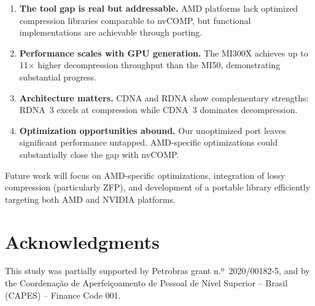 \documentclass[runningheads]{llncs}
\begin{document}
\begin{enumerate}
    \item \textbf{The tool gap is real but addressable.} AMD platforms lack optimized compression libraries comparable to nvCOMP, but functional implementations are achievable through porting.
    
    \item \textbf{Performance scales with GPU generation.} The MI300X achieves up to 11$\times$ higher decompression throughput than the MI50, demonstrating substantial progress.
    
    \item \textbf{Architecture matters.} CDNA and RDNA show complementary strengths: RDNA~3 excels at compression while CDNA~3 dominates decompression.
    
    \item \textbf{Optimization opportunities abound.} Our unoptimized port leaves significant performance untapped. AMD-specific optimizations could substantially close the gap with nvCOMP.
\end{enumerate}

Future work will focus on AMD-specific optimizations, integration of lossy compression (particularly ZFP), and development of a portable library efficiently targeting both AMD and NVIDIA platforms.





\section*{Acknowledgments}

This study was partially supported by Petrobras grant n.º~2020/00182-5, and by the Coordenação de Aperfeiçoamento de Pessoal de Nível Superior – Brasil (CAPES) – Finance Code 001.




\end{document}
